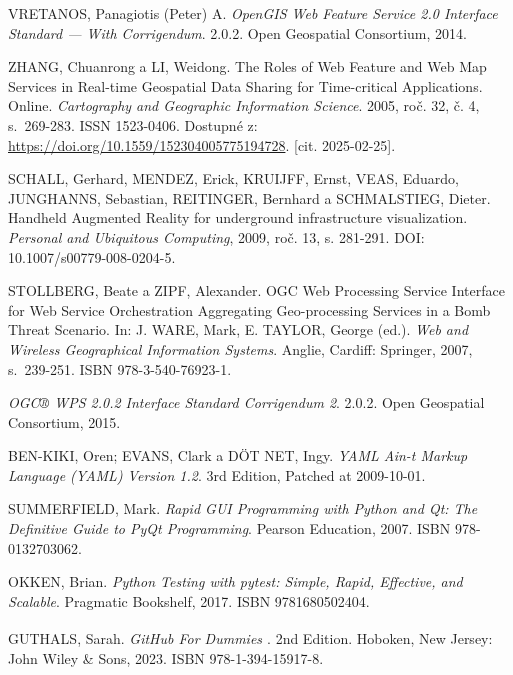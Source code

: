 \documentclass[a4paper,oneside,12pt]{book}
\begin{document}
\begin{thebibliography}{1}
VRETANOS, Panagiotis (Peter) A. \textit{OpenGIS Web Feature Service 2.0 Interface Standard --- With Corrigendum}. 2.0.2. Open Geospatial Consortium, 2014.

ZHANG, Chuanrong a LI, Weidong. The Roles of Web Feature and Web Map Services in Real-time Geospatial Data Sharing for Time-critical Applications. Online. \textit{Cartography and Geographic Information Science}. 2005, roč. 32, č. 4, s.~269-283. ISSN 1523-0406. Dostupné z: \url{https://doi.org/10.1559/152304005775194728}. [cit. 2025-02-25].

SCHALL, Gerhard, MENDEZ, Erick, KRUIJFF, Ernst, VEAS, Eduardo, JUNGHANNS, Sebastian, REITINGER, Bernhard a SCHMALSTIEG, Dieter.  
Handheld Augmented Reality for underground infrastructure visualization.  
\textit{Personal and Ubiquitous Computing}, 2009, roč. 13, s. 281-291.  
DOI: 10.1007/s00779-008-0204-5.  

STOLLBERG, Beate a ZIPF, Alexander. OGC Web Processing Service Interface for Web Service Orchestration Aggregating Geo-processing Services in a Bomb Threat Scenario. In: J. WARE, Mark, E. TAYLOR, George (ed.). \textit{Web and Wireless Geographical Information Systems}. Anglie, Cardiff: Springer, 2007, s.~239-251. ISBN 978-3-540-76923-1.

\textit{OGC® WPS 2.0.2 Interface Standard Corrigendum 2}. 2.0.2. Open Geospatial Consortium, 2015.

BEN-KIKI, Oren; EVANS, Clark a DÖT NET, Ingy. \textit{YAML Ain-t Markup Language (YAML) Version 1.2}. 3rd Edition, Patched at 2009-10-01.

SUMMERFIELD, Mark. \textit{Rapid GUI Programming with Python and Qt: The Definitive Guide to PyQt Programming}. Pearson Education, 2007. ISBN 978-0132703062.

OKKEN, Brian. \textit{Python Testing with pytest: Simple, Rapid, Effective, and Scalable}. Pragmatic Bookshelf, 2017. ISBN 9781680502404.

GUTHALS, Sarah. \textit{GitHub\texorpdfstring{\textsuperscript{\textregistered}}{ (R)} For Dummies \texorpdfstring{\textsuperscript{\textregistered}}{(R)}}. 2nd Edition. Hoboken, New Jersey: John Wiley \& Sons, 2023. ISBN 978-1-394-15917-8.

\end{thebibliography}
\end{document}
